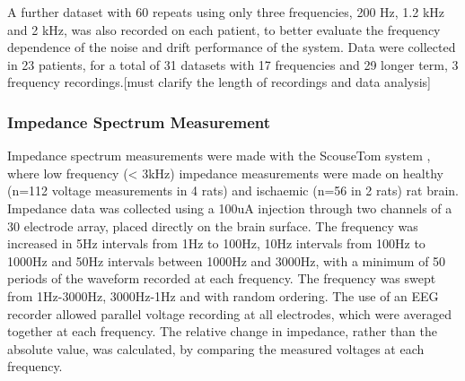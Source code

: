 A further dataset with 60 repeats using only three frequencies, 200 Hz, 1.2 kHz and 2 kHz, was also recorded on each patient, to better evaluate the frequency dependence of the noise and drift performance of the system. Data were collected in 23 patients, for a total of 31 datasets with 17 frequencies and 29 longer term, 3 frequency recordings.[must clarify the length of recordings and data analysis] 

\subsubsection{Impedance Spectrum Measurement}

Impedance spectrum measurements were made with the ScouseTom system \cite{Dowrick_2015}, where low frequency (< 3kHz) impedance measurements were made on healthy (n=112 voltage measurements in 4 rats) and ischaemic (n=56 in 2 rats) rat brain. Impedance data was collected using a 100uA injection through two channels of a 30 electrode array, placed directly on the brain surface. The frequency was increased in 5Hz intervals from 1Hz to 100Hz, 10Hz intervals from 100Hz to 1000Hz and 50Hz intervals between 1000Hz and 3000Hz, with a minimum of 50 periods of the waveform recorded at each frequency. The frequency was swept from 1Hz-3000Hz, 3000Hz-1Hz and with random ordering. The use of an EEG recorder allowed parallel voltage recording at all electrodes, which were averaged together at each frequency. The relative change in impedance, rather than the absolute value, was calculated, by comparing the measured voltages at each frequency.
